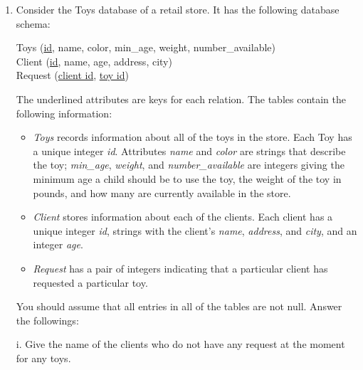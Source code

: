 \documentclass[12pt,a3paper]{article}
\newcommand{\yr}[1]{\hfill\textcolor{gray}{\small\textbf{[#1]}}}
\newcommand{\mk}[1]{\textcolor{orange!70!black}{\small\textbf{(#1 marks)}}}
\begin{document}
\begin{enumerate}
\begin{enumerate}[label=\roman*.]
    \item Write a SQL query that find the reviewers with the most papers assigned to them. \underline{There can be more than one such reviewer.} The output of the query should be a list of reviewer names. A reviewer should be listed if no other reviewer has strictly more papers to review.
\end{enumerate}
\mk{15} \yr{CSE 215 | L-2/T-2 | 2020--21}

\item Consider the Toys database of a retail store. It has the following database schema:

\vspace{0.2cm}
\noindent Toys (\underline{id}, name, color, min\_age, weight, number\_available) \\
Client (\underline{id}, name, age, address, city) \\
Request (\underline{client id}, \underline{toy id})

\vspace{0.2cm}
\noindent The underlined attributes are keys for each relation. The tables contain the following information:

\begin{itemize}
    \item \textit{Toys} records information about all of the toys in the store. Each Toy has a unique integer \textit{id}. Attributes \textit{name} and \textit{color} are strings that describe the toy; \textit{min\_age}, \textit{weight}, and \textit{number\_available} are integers giving the minimum age a child should be to use the toy, the weight of the toy in pounds, and how many are currently available in the store.
    
    \item \textit{Client} stores information about each of the clients. Each client has a unique integer \textit{id}, strings with the client's \textit{name}, \textit{address}, and \textit{city}, and an integer \textit{age}.
    
    \item \textit{Request} has a pair of integers indicating that a particular client has requested a particular toy.
\end{itemize}

\noindent You should assume that all entries in all of the tables are not null. Answer the followings:

\vspace{0.2cm}
\noindent i. Give the name of the clients who do not have any request at the moment for any toys.


\end{enumerate}
\end{document}

